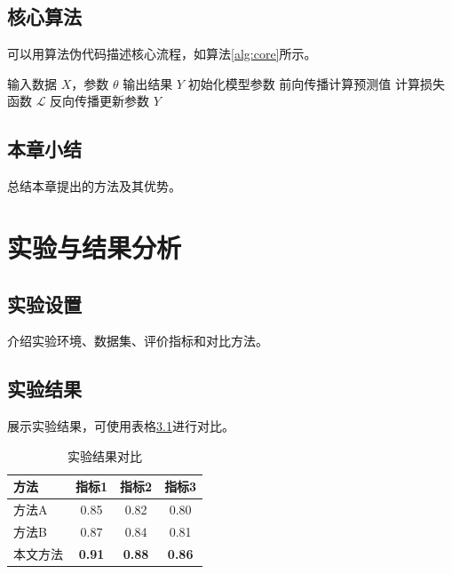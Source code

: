 \documentclass[12pt,a4paper,openright,UTF8]{ctexbook}
\begin{document}
\section{核心算法}
\label{sec:algorithm}

可以用算法伪代码描述核心流程，如算法\ref{alg:core}所示。

\begin{algorithm}[htbp]
    \caption{核心算法}
    \label{alg:core}
    \begin{algorithmic}[1]
        \Require 输入数据 $X$，参数 $\theta$
        \Ensure 输出结果 $Y$
        \State 初始化模型参数
            \State 前向传播计算预测值
            \State 计算损失函数 $\mathcal{L}$
            \State 反向传播更新参数
        \EndFor
        \State \Return $Y$
    \end{algorithmic}
\end{algorithm}

\section{本章小结}
\label{sec:method-summary}

总结本章提出的方法及其优势。


\chapter{实验与结果分析}
\label{chap:experiment}

\section{实验设置}
\label{sec:setup}

介绍实验环境、数据集、评价指标和对比方法。

\section{实验结果}
\label{sec:result}

展示实验结果，可使用表格\ref{tab:result}进行对比。

\begin{table}[htbp]
    \centering
    \caption{实验结果对比}
    \label{tab:result}
    \begin{tabular}{lccc}
        \toprule
        方法 & 指标1 & 指标2 & 指标3 \\
        \midrule
        方法A & 0.85 & 0.82 & 0.80 \\
        方法B & 0.87 & 0.84 & 0.81 \\
        本文方法 & \textbf{0.91} & \textbf{0.88} & \textbf{0.86} \\
        \bottomrule
    \end{tabular}
\end{table}
\end{document}
